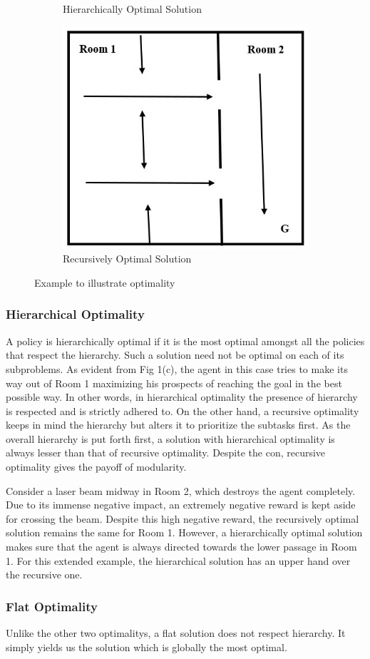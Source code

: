 \begin{figure}[ht]
\begin{subfigure}[b]{0.5\linewidth}
    \caption{Hierarchically Optimal Solution} 
    \vspace{4ex}
  \end{subfigure}%
  \begin{subfigure}[b]{0.5\linewidth}
    \centering
    \includegraphics[width=.5\linewidth]{images/img4.JPG} 
    \caption{Recursively Optimal Solution} 
    \vspace{4ex}
  \end{subfigure} 
    \caption{Example to illustrate optimality}

\end{figure}

\subsubsection*{Hierarchical Optimality}

A policy is hierarchically optimal if it is the most optimal amongst all the policies that respect the hierarchy. Such a solution need not be optimal on each of its subproblems. As evident from Fig 1(c), the agent in this case tries to make its way out of Room 1 maximizing his prospects of reaching the goal in the best possible way. In other words, in hierarchical optimality the presence of hierarchy is respected and is strictly adhered to. On the other hand, a recursive optimality keeps in mind the hierarchy but alters it to prioritize the subtasks first. As the overall hierarchy is put forth first, a solution with hierarchical optimality is always lesser than that of recursive optimality. Despite the con, recursive optimality gives the payoff of modularity. 

Consider a laser beam midway in Room 2, which destroys the agent completely. Due to its immense negative impact, an extremely negative reward is kept aside for crossing the beam. Despite this high negative reward, the recursively optimal solution remains the same for Room 1. However, a hierarchically optimal solution makes sure that the agent is always directed towards the lower passage in Room 1. For this extended example, the hierarchical solution has an upper hand over the recursive one. 


\subsubsection*{Flat Optimality}

Unlike the other two optimalitys, a flat solution does not respect hierarchy. It simply yields us the solution which is globally the most optimal. 
